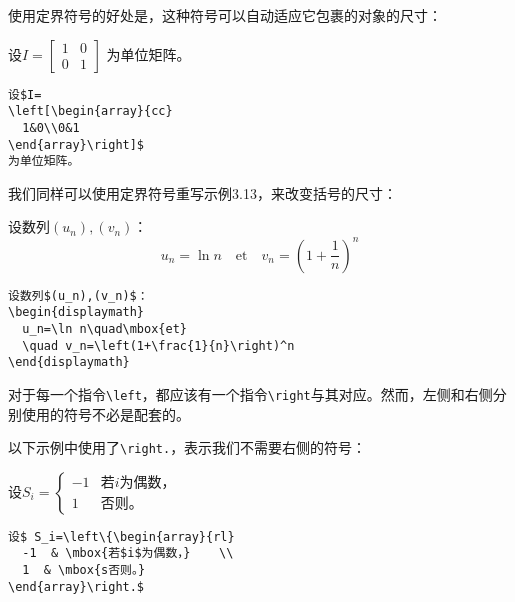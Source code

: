 使用定界符号的好处是，这种符号可以自动适应它包裹的对象的尺寸：

\begin{codelist}[3.16]{
  设$I=
\left[\begin{array}{cc}
  1&0\\0&1
\end{array}\right]$
为单位矩阵。
}\begin{verbatim}
设$I=
\left[\begin{array}{cc}
  1&0\\0&1
\end{array}\right]$
为单位矩阵。
\end{verbatim}
\end{codelist}

我们同样可以使用定界符号重写示例3.13，来改变括号的尺寸：

\begin{codelist}[3.17]{
  设数列$(u_n),(v_n)$：
\begin{displaymath}
  u_n=\ln n\quad\mbox{et}
  \quad v_n=\left(1+\frac{1}{n}\right)^n
\end{displaymath}
}\begin{verbatim}
设数列$(u_n),(v_n)$：
\begin{displaymath}
  u_n=\ln n\quad\mbox{et}
  \quad v_n=\left(1+\frac{1}{n}\right)^n
\end{displaymath}
\end{verbatim}
\end{codelist}

\begin{exclamation}
对于每一个指令\verb|\left|，都应该有一个指令\verb|\right|与其对应。然而，左侧和右侧分别使用的符号不必是配套的。
\end{exclamation}

以下示例中使用了\verb|\right.|，表示我们不需要右侧的符号：

\begin{codelist}[3.18]{
  设$ S_i=\left\{\begin{array}{rl}
    -1  & \mbox{若$i$为偶数，}    \\
    1  & \mbox{否则。}
  \end{array}\right.$
}\begin{verbatim}
设$ S_i=\left\{\begin{array}{rl}
  -1  & \mbox{若$i$为偶数，}    \\
  1  & \mbox{s否则。}
\end{array}\right.$
\end{verbatim}
\end{codelist}

